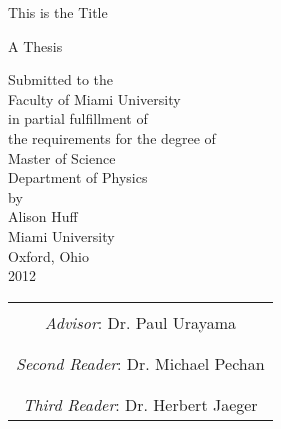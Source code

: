 \documentclass[12pt]{book}
\begin{document}
\thispagestyle{empty}

	\begin{center}

		This is the Title

		\vspace{1.5cm}

		
		A Thesis\\
		
		\vspace{0.5cm}
		
		Submitted to the\\
		Faculty of Miami University\\
		in partial fulfillment of\\
		the requirements for the degree of\\
		Master of Science\\
		Department of Physics\\
		by\\
		Alison Huff\\
		Miami University\\
		Oxford, Ohio\\
		2012 %
		
		\vspace{1.5cm}
		
		\begin{table}[h!]
		\begin{center}
		\begin{tabular}{c}
					\hline\\
					\emph{Advisor}: Dr. Paul Urayama\\
					\vspace{1.0cm}\\
					\hline\\
					\emph{Second Reader}: Dr. Michael Pechan\\
					\vspace{1.0cm}\\
					\hline\\
					\emph{Third Reader}: Dr. Herbert Jaeger\\
		\end{tabular}
		\end{center}
		\end{table}
					
		
		\vspace{2.5cm}

	\end{center}
\end{document}
